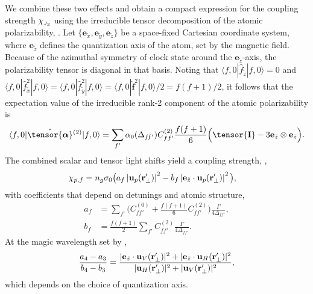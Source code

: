 \documentclass[preprint, aps,pra,onecolumn]{revtex4-1} %
\newcommand{\unittens}{\tensor{\mathbf{I}}}
\newcommand{\poltens}{\hat{\tensor{\boldsymbol{\alpha}}}}
\newcommand{\charpol}{\alpha_0(\Delta_{f\!f'})}
\newcommand{\qaxis}{\mathbf{e}_{\tilde{z}}}
\newcommand{\chieff}{\chi_{\raisebox{-.1pt}{\tiny $J_3$}}}
\begin{document}
We combine these two effects and obtain a compact expression for the coupling strength $\chieff$ using the irreducible tensor decomposition of the atomic polarizability, .  
Let $\{\mathbf{e}_{\tilde{x}},\mathbf{e}_{\tilde{y}}, \mathbf{e}_{\tilde{z}}\}$ be a space-fixed Cartesian coordinate system, where $\mathbf{e}_{\tilde{z}}$ defines the quantization axis of the atom, set by the magnetic field.  Because of the azimuthal symmetry of clock state around the $\qaxis$-axis, the polarizability tensor is diagonal in that basis.  
Noting that $\langle f,0 | \hat{f}_{\tilde{z}}| f,0 \rangle =0$ and $\langle f,0 | \hat{f}_{\tilde{x}}^2| f,0 \rangle = \langle f,0 | \hat{f}_{\tilde{y}}^2| f,0 \rangle = \langle f,0 | \hat{\mathbf{f}}^2| f,0 \rangle /2 =f(f+1)/2$, it follows that the expectation value of the irreducible rank-2 component of the atomic polarizability is
	\begin{align} \label{Eq::CouplingAngleMagic}
		\langle f,0 | \poltens \phantom{}^{(2)}| f,0 \rangle = \sum_{f'} \charpol C^{(2)}_{ff'} \frac{f(f+1)}{6} \Big( \unittens - 3\qaxis \otimes \qaxis \Big).
	\end{align}
The combined scalar and tensor light shifts yield a coupling strength, ,
	\begin{align}
		\chi_{p,f} &  = n_g \sigma_0 \big(  a_{f} \left|\mathbf{u}_p(\mathbf{r}'_\perp)\right|^2 - b_{f} \left|\mathbf{e}_{\tilde{z}} \cdot \mathbf{u}_p(\mathbf{r}'_\perp)\right|^2 \big), \label{Eq::ClockStateCoupling}
	\end{align}
with coefficients that depend on detunings and atomic structure,
	\begin{align}
		a_f &= \sum_{f'}  \Big(C^{(0)}_{ff'} + \frac{f(f+1)}{6} C^{(2)}_{ff'} \Big) \frac{\Gamma}{4 \Delta_{ff'}},\\
		b_f &= \frac{f(f+1)}{2}\sum_{f'} C^{(2)}_{ff'}  \frac{\Gamma}{4 \Delta_{ff'}}.
	\end{align}
At the magic wavelength set by ,
\begin{equation}
	\frac{a_4-a_3}{b_4-b_3} =  \frac{ |\mathbf{e}_{\tilde{z}} \cdot \mathbf{u}_V(\mathbf{r}'_\perp)|^2  + |\mathbf{e}_{\tilde{z}} \cdot \mathbf{u}_H(\mathbf{r}'_\perp) |^2 }{ |\mathbf{u}_H(\mathbf{r}'_\perp)|^2 + |\mathbf{u}_V(\mathbf{r}'_\perp)|^2 },
\end{equation}
which depends on the choice of quantization axis.
\end{document}
